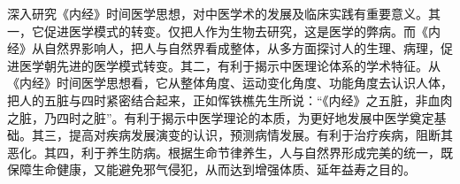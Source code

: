 \documentclass[draft,12pt]{ctexbook}
\begin{document}
深入研究《内经》时间医学思想，对中医学术的发展及临床实践有重要意义。其一，它促进医学模式的转变。仅把人作为生物去研究，这是医学的弊病。而《内经》从自然界影响人，把人与自然界看成整体，从多方面探讨人的生理、病理，促进医学朝先进的医学模式转变。其二，有利于揭示中医理论体系的学术特征。从《内经》时间医学思想看，它从整体角度、运动变化角度、功能角度去认识人体，把人的五脏与四时紧密结合起来，正如恽铁樵先生所说：“《内经》之五脏，非血肉之脏，乃四时之脏”。有利于揭示中医学理论的本质，为更好地发展中医学奠定基础。其三，提高对疾病发展演变的认识，预测病情发展。有利于治疗疾病，阻断其恶化。其四，利于养生防病。根据生命节律养生，人与自然界形成完美的统一，既保障生命健康，又能避免邪气侵犯，从而达到增强体质、延年益寿之目的。

\ifx \allfiles \undefined
\end{document}
